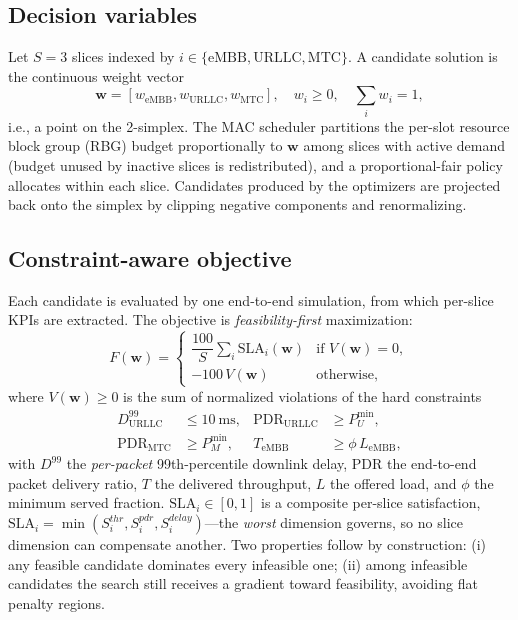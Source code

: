 \documentclass[conference]{IEEEtran}
\begin{document}
\subsection{Decision variables}
Let $S = 3$ slices indexed by $i \in \{\mathrm{eMBB}, \mathrm{URLLC},
\mathrm{MTC}\}$. A candidate solution is the continuous weight vector
\begin{equation}
\mathbf{w} = [w_{\mathrm{eMBB}}, w_{\mathrm{URLLC}}, w_{\mathrm{MTC}}], \quad
w_i \ge 0, \quad \sum_{i} w_i = 1,
\end{equation}
i.e., a point on the 2-simplex. The MAC scheduler partitions the per-slot
resource block group (RBG) budget proportionally to $\mathbf{w}$ among slices
with active demand (budget unused by inactive slices is redistributed), and a
proportional-fair policy allocates within each slice. Candidates produced by
the optimizers are projected back onto the simplex by clipping negative
components and renormalizing.

\subsection{Constraint-aware objective}
Each candidate is evaluated by one end-to-end simulation, from which per-slice
KPIs are extracted. The objective is \emph{feasibility-first} maximization:
\begin{equation}
F(\mathbf{w}) =
\begin{cases}
\dfrac{100}{S}\sum_{i} \mathrm{SLA}_i(\mathbf{w}) & \text{if } V(\mathbf{w}) = 0,\\[2mm]
-100\, V(\mathbf{w}) & \text{otherwise,}
\end{cases}
\end{equation}
where $V(\mathbf{w}) \ge 0$ is the sum of normalized violations of the hard
constraints
\begin{align}
D^{99}_{\mathrm{URLLC}} &\le 10~\mathrm{ms}, &
\mathrm{PDR}_{\mathrm{URLLC}} &\ge P^{\min}_{U}, \\
\mathrm{PDR}_{\mathrm{MTC}} &\ge P^{\min}_{M}, &
T_{\mathrm{eMBB}} &\ge \phi\, L_{\mathrm{eMBB}},
\end{align}
with $D^{99}$ the \emph{per-packet} 99th-percentile downlink delay, PDR the
end-to-end packet delivery ratio, $T$ the delivered throughput, $L$ the offered
load, and $\phi$ the minimum served fraction. $\mathrm{SLA}_i \in [0,1]$ is a
composite per-slice satisfaction, $\mathrm{SLA}_i = \min(S^{thr}_i, S^{pdr}_i,
S^{delay}_i)$---the \emph{worst} dimension governs, so no slice dimension can
compensate another. Two properties follow by construction: (i) any feasible
candidate dominates every infeasible one; (ii) among infeasible candidates the
search still receives a gradient toward feasibility, avoiding flat penalty
regions.
\end{document}
